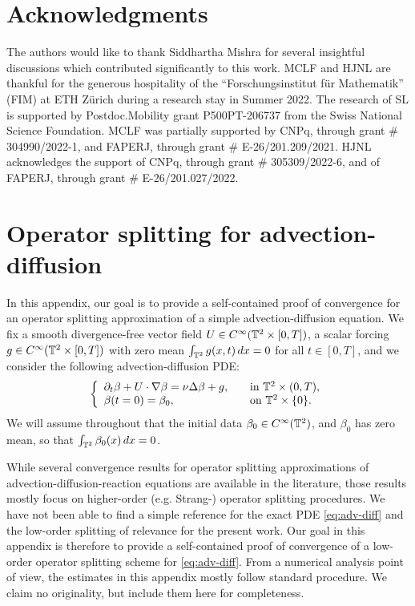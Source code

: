 \documentclass[reqno,12pt]{amsart}
\begin{document}
\section*{Acknowledgments}
The authors would like to thank Siddhartha Mishra for several insightful discussions which contributed significantly to this work. MCLF and HJNL are thankful for the generous hospitality of the ``Forschungsinstitut f\"ur Mathematik'' (FIM) at ETH Z\"urich during a research stay in Summer 2022.
The research of SL is supported by Postdoc.Mobility grant P500PT-206737 from the Swiss National Science Foundation.
MCLF was partially supported by CNPq, through grant \# 304990/2022-1, and FAPERJ, through  grant \# E-26/201.209/2021.
HJNL acknowledges the support of CNPq, through  grant \# 305309/2022-6, and of FAPERJ, through  grant \# E-26/201.027/2022.



\appendix
\section{Operator splitting for advection-diffusion}
\label{app:adv-diff}

In this appendix, our goal is to provide a self-contained proof of convergence for an operator splitting approximation of a simple advection-diffusion equation. We fix a smooth divergence-free vector field $U \in C^\infty(\mathbb{T}^2\times [0,T])$, a scalar forcing $g\in C^\infty(\mathbb{T}^2\times[0,T])$ with zero mean $\int_{\mathbb{T}^2} g(x,t)\, dx = 0$ for all $t\in [0,T]$, and we consider the following advection-diffusion PDE:
\begin{gather}
  \label{eq:adv-diff}
  \left\{
  \begin{array}{ll}
    \partial_t \beta + U\cdot \nabla \beta = \nu \Delta \beta + g, \quad & \text{in } \mathbb{T}^2 \times (0,T), \\
    \beta(t=0) = \beta_0, &\text{on } \mathbb{T}^2 \times \{0\}.
  \end{array}
  \right.
\end{gather}
We will assume throughout that the initial data $\beta_0 \in C^\infty(\mathbb{T}^2)$, and $\beta_0$ has zero mean, so that $\int_{\mathbb{T}^2} \beta_0(x) \, dx = 0$.

\begin{remark}
While several convergence results for operator splitting approximations of advection-diffusion-reaction equations are available in the literature, those results mostly focus on higher-order (e.g. Strang-) operator splitting procedures. We have not been able to find a simple reference for the exact PDE \eqref{eq:adv-diff} and the low-order splitting of relevance for the present work. Our goal in this appendix is therefore to provide a self-contained proof of convergence of a low-order operator splitting scheme for \eqref{eq:adv-diff}. From a numerical analysis point of view, the estimates in this appendix mostly follow standard procedure. We claim no originality, but include them here for completeness.
\end{remark}
\end{document}
